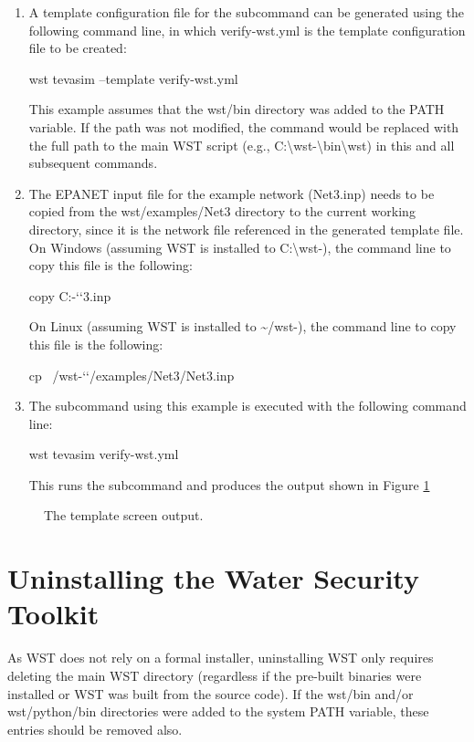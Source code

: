 \begin{enumerate}
  \item A template configuration file for the  subcommand 
  can be generated using the following command line, in which verify-wst.yml 
  is the template configuration file to be created:
    \begin{unknownListing}
wst tevasim --template verify-wst.yml
\end{unknownListing}
    This example assumes that the wst/bin directory was added to the PATH variable. 
	If the path was not modified, the  command would be replaced with the full 
	path to the main WST script (e.g., C:\textbackslash wst-\wstversion\textbackslash bin\textbackslash wst)
	in this and all subsequent commands.
  \item The EPANET input file for the example network (Net3.inp) needs to be copied from the
    wst/examples/Net3 directory to the current working directory, since it is 
	the network file referenced in the generated template file. On Windows (assuming WST 
	is installed to C:\textbackslash wst-\wstversion), the command line to copy this file is the following:
    \begin{unknownListing}
copy C:\wst-`\wstversion`\examples{}\Net3.inp
\end{unknownListing}
    On Linux (assuming WST is installed to \textasciitilde/wst-\wstversion), the command line 
	to copy this file is the following:
    \begin{unknownListing}
cp ~/wst-`\wstversion`/examples/Net3/Net3.inp
\end{unknownListing}
  \item The  subcommand using this example is executed with the following 
  command line:
    \begin{unknownListing}
wst tevasim verify-wst.yml
\end{unknownListing}
    This runs the  subcommand and produces the output shown in Figure \ref{fig:tevasim_getting started}
\end{enumerate}

\begin{figure}[h]
\caption{The  template screen output.}
\label{fig:tevasim_getting started}
\end{figure}


\section{Uninstalling the Water Security Toolkit}

As WST does not rely on a formal installer, uninstalling WST only requires
deleting the main WST directory (regardless if the 
pre-built binaries were installed or WST was built from the source code). 
If the wst/bin and/or wst/python/bin directories were added to the system
PATH variable, these entries should be removed also.

